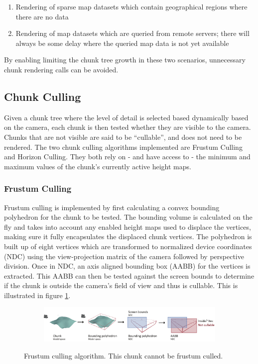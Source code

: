 \begin{enumerate}
\item Rendering of sparse map datasets which contain geographical regions where there are no data
\item Rendering of map datasets which are queried from remote servers; there will always be some delay where the queried map data is not yet available
\end{enumerate}

By enabling limiting the chunk tree growth in these two scenarios, unnecessary chunk rendering calls can be avoided.

\subsection{Chunk Culling}
Given a chunk tree where the level of detail is selected based dynamically based on the camera, each chunk is then tested whether they are visible to the camera. Chunks that are not visible are said to be ``cullable'', and does not need to be rendered. The two chunk culling algorithms implemented are Frustum Culling and Horizon Culling. They both rely on - and have access to - the minimum and maximum values of the chunk's currently active height maps. 

\subsubsection{Frustum Culling}
Frustum culling is implemented by first calculating a convex bounding polyhedron for the chunk to be tested. The bounding volume is calculated on the fly and takes into account any enabled height maps used to displace the vertices, making sure it fully encapsulates the displaced chunk vertices. The polyhedron is built up of eight vertices which are transformed to normalized device coordinates (NDC) using the view-projection matrix of the camera followed by perspective division. Once in NDC, an axis aligned bounding box (AABB) for the vertices is extracted. This AABB can then be tested against the screen bounds to determine if the chunk is outside the camera's field of view and thus is cullable. This is illustrated in figure \ref{fig:frustumculling}.

\begin{figure}[htbp]
    \centering
    \begin{subfigure}[bt]{1.0\textwidth}
        \includegraphics[width=\textwidth]{figures/implementation/chunklod/frustumculling.pdf}
    \end{subfigure}
    \caption{Frustum culling algorithm. This chunk cannot be frustum culled.}
    \label{fig:frustumculling}
\end{figure}

